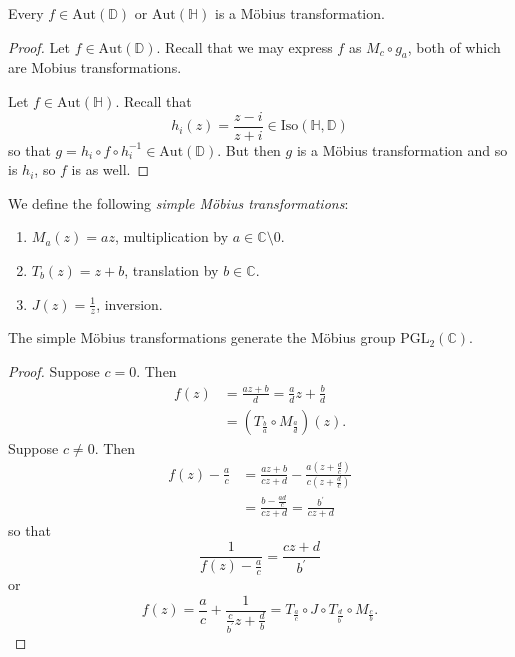 \begin{theorem}
Every $f \in \mathrm{Aut}(\mathbb{D})$ or
$\mathrm{Aut}(\mathbb{H})$ is a M\"obius transformation.
\end{theorem}

\begin{proof}
Let $f \in \mathrm{Aut}(\mathbb{D})$. Recall that we may
express $f$ as $M_c \circ g_a$, both of which are Mobius
transformations.

Let $f \in \mathrm{Aut}(\mathbb{H})$. Recall that
$$
  h_i(z)
= \frac{z - i}{z + i}
\in \mathrm{Iso}(\mathbb{H}, \mathbb{D})
$$
so that
$g = h_i \circ f \circ h_i^{-1} \in \mathrm{Aut}(\mathbb{D})$.
But then $g$ is a M\"obius transformation and so is $h_i$,
so $f$ is as well.
\end{proof}

\begin{defn}
We define the following \emph{simple M\"obius transformations}:
\begin{enumerate}
  \item{
    $M_a(z) = a z$, multiplication by $a \in \mathbb{C} \setminus 0$.
  }
  \item{
    $T_b(z) = z + b$, translation by $b \in \mathbb{C}$.
  }
  \item{
    $J(z) = \frac{1}{z}$, inversion.
  }
\end{enumerate}
\end{defn}

\begin{lemma}
The simple M\"obius transformations generate the M\"obius group
$\mathrm{PGL}_2(\mathbb{C})$.
\end{lemma}

\begin{proof}
Suppose $c = 0$. Then
\begin{align*}
   f(z)
&= \frac{az + b}{d}
 = \frac{a}{d} z + \frac{b}{d} \\
&= (T_{\frac{b}{a}} \circ M_{\frac{a}{d}})(z).
\end{align*}
Suppose $c \neq 0$. Then
\begin{align*}
   f(z) - \frac{a}{c}
&= \frac{a z + b}{c z + d}
 - \frac{a(z + \frac{d}{c})}
        {c(z + \frac{d}{c})} \\
&= \frac{b - \frac{ad}{c}}
        {c z + d}
 = \frac{b^\prime}{c z + d}
\end{align*}
so that
$$
  \frac{1}{f(z) - \frac{a}{c}}
= \frac{cz + d}{b^\prime}
$$
or
$$
  f(z)
= \frac{a}{c}
+ \frac{1}
       {\frac{c}{b^\prime} z + \frac{d}{b}}
=     T_{\frac{a}{c}}
\circ J
\circ T_{\frac{d}{b^\prime}}
\circ M_{\frac{c}{b}}.
$$
\end{proof}

